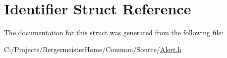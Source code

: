 \hypertarget{struct_identifier}{}\section{Identifier Struct Reference}
\label{struct_identifier}


The documentation for this struct was generated from the following file\+:\begin{DoxyCompactItemize}
\item 
C\+:/\+Projects/\+Bergermeister\+Home/\+Common/\+Source/\mbox{\hyperlink{_alert_8h}{Alert.\+h}}\end{DoxyCompactItemize}
